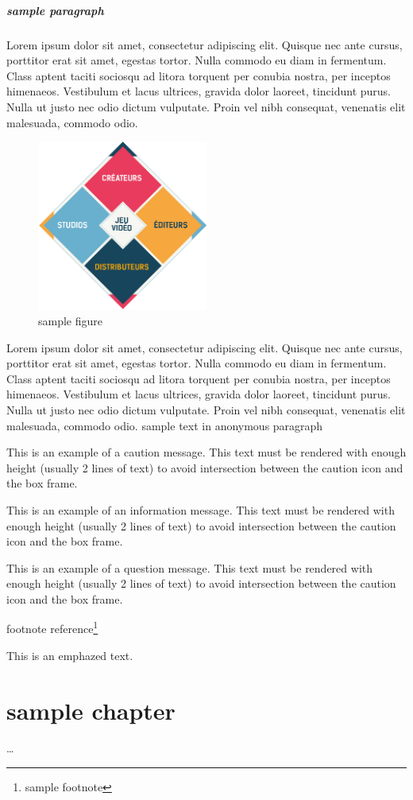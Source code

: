 \documentclass[report, backcover, french, nodocumentinfo]{upmethodology-document}
\begin{document}
					\paragraph*{sample paragraph}
						Lorem ipsum dolor sit amet, consectetur adipiscing elit. Quisque nec ante cursus, porttitor erat sit amet, egestas tortor. Nulla commodo eu diam in fermentum. Class aptent taciti sociosqu ad litora torquent per conubia nostra, per inceptos himenaeos. Vestibulum et lacus ultrices, gravida dolor laoreet, tincidunt purus. Nulla ut justo nec odio dictum vulputate. Proin vel nibh consequat, venenatis elit malesuada, commodo odio.
						\begin{figure}[h!]
							\centering
							\includegraphics[width=0.5\textwidth]{figures/sample} %
							\caption{sample figure}
							\label{fig:sampleFigure}
						\end{figure}
					\p{}
						Lorem ipsum dolor sit amet, consectetur adipiscing elit. Quisque nec ante cursus, porttitor erat sit amet, egestas tortor. Nulla commodo eu diam in fermentum. Class aptent taciti sociosqu ad litora torquent per conubia nostra, per inceptos himenaeos. Vestibulum et lacus ultrices, gravida dolor laoreet, tincidunt purus. Nulla ut justo nec odio dictum vulputate. Proin vel nibh consequat, venenatis elit malesuada, commodo odio.
						sample text in anonymous paragraph
						\begin{upmcaution}
							This is an example of a caution message. This text must be rendered with enough height (usually 2 lines of text) to avoid intersection between the caution icon and the box frame.
						\end{upmcaution}
						\begin{upminfo}
							This is an example of an information message. This text must be rendered with enough height (usually 2 lines of text) to avoid intersection between the caution icon and the box frame.
						\end{upminfo}
						\begin{upmquestion}
							This is an example of a question message. This text must be rendered with enough height (usually 2 lines of text) to avoid intersection between the caution icon and the box frame.
						\end{upmquestion}
						footnote reference\footnote{sample footnote}\\
						\begin{emphbox}[.7\linewidth]
							This is an emphazed text.
						\end{emphbox}
	\chapter{sample chapter}
		\ldots
\end{document}
